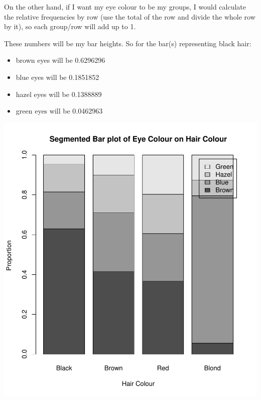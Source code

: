 \documentclass[
]{book}
\theoremstyle{definition}
\theoremstyle{definition}
\theoremstyle{definition}
\theoremstyle{definition}
\theoremstyle{remark}
\begin{document}
On the other hand, if I want my eye colour to be my groups, I would
calculate the relative frequencies by row (use the total of the row and
divide the whole row by it), so each group/row will add up to 1.

These numbers will be my bar heights. So for the bar(s) representing
black hair:

\begin{itemize}
\item
  brown eyes will be 0.6296296
\item
  blue eyes will be 0.1851852
\item
  hazel eyes will be 0.1388889
\item
  green eyes will be 0.0462963
\end{itemize}

\includegraphics{_main_files/figure-latex/unnamed-chunk-12-1.pdf}
\end{document}
